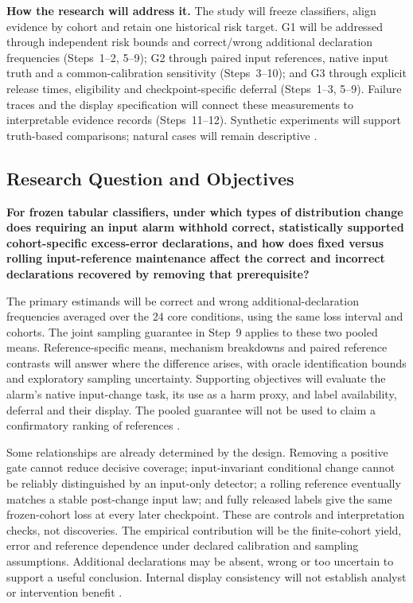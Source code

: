 \documentclass[11pt,a4paper]{article}
\begin{document}
\textbf{How the research will address it.} The study will freeze classifiers,
align evidence by cohort and retain one historical risk target. G1 will be
addressed through independent risk bounds and correct/wrong additional
declaration frequencies (Steps~1--2, 5--9); G2 through paired input references,
native input truth and a common-calibration sensitivity (Steps~3--10); and G3
through explicit release times, eligibility and checkpoint-specific deferral
(Steps~1--3, 5--9). Failure traces and the display specification will connect
these measurements to interpretable evidence records (Steps~11--12).
Synthetic experiments will support truth-based comparisons; natural cases
will remain descriptive \cite{cerqueira,window,pudd,souza}.

\subsection*{Research Question and Objectives}
\textbf{For frozen tabular classifiers, under which types of distribution
change does requiring an input alarm withhold correct, statistically supported
cohort-specific excess-error declarations, and how does fixed versus rolling
input-reference maintenance affect the correct and incorrect declarations
recovered by removing that prerequisite?}

The primary estimands will be correct and wrong additional-declaration
frequencies averaged over the 24 core conditions, using the same loss
interval and cohorts. The joint sampling guarantee in Step~9 applies to
these two pooled means. Reference-specific means, mechanism breakdowns and
paired reference contrasts will answer where the difference arises, with
oracle identification bounds and exploratory sampling uncertainty.
Supporting objectives will evaluate the alarm's native input-change task,
its use as a harm proxy, and label availability, deferral and their display.
The pooled guarantee will not be used to claim a confirmatory ranking of
references \cite{cerqueira,window,pudd}.

Some relationships are already determined by the design. Removing a positive
gate cannot reduce decisive coverage; input-invariant conditional change cannot
be reliably distinguished by an input-only detector; a rolling reference
eventually matches a stable post-change input law; and fully released labels
give the same frozen-cohort loss at every later checkpoint. These are controls
and interpretation checks, not discoveries. The empirical contribution will be
the finite-cohort yield, error and reference dependence under declared
calibration and sampling assumptions. Additional declarations may be absent,
wrong or too uncertain to support a useful conclusion. Internal display
consistency will not establish analyst or intervention benefit
\cite{window,pudd,selective,driftvis}.
\end{document}
